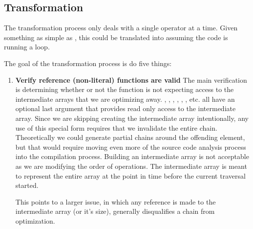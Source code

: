 \subsection{Transformation}\label{Transformation}

The transformation process only deals with a single operator at a time.  Given something as simple as , this could be translated into  assuming the code is running a  loop.

The goal of the transformation process is do five things:
\begin{enumerate}
  \item \textbf{Verify reference (non-literal) functions are valid}
    The main verification is determining whether or not the function is not expecting access to the intermediate arrays that we are optimizing away.  , , , , , , etc.  all have an optional last argument that provides read only access to the intermediate array.  Since we are skipping creating the intermediate array intentionally, any use of this special form requires that we invalidate the entire chain. Theoretically we could generate partial chains around the offending element, but that would require moving even more of the source code analysis process into the compilation process.  Building an intermediate array is not acceptable as we are modifying the order of operations.  The intermediate array is meant to represent the entire array at the point in time before the current traversal started.  

    This points to a larger issue, in which any reference is made to the intermediate array (or it's size), generally disqualifies a chain from optimization.
  

\end{enumerate}
